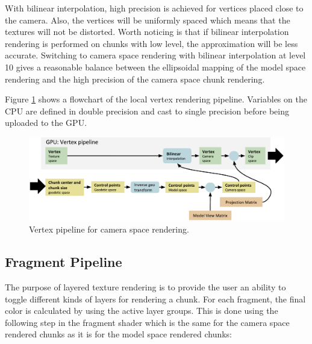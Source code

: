 With bilinear interpolation, high precision is achieved for vertices placed close to the camera. Also, the vertices will be uniformly spaced which means that the textures will not be distorted. Worth noticing is that if bilinear interpolation rendering is performed on chunks with low level, the approximation will be less accurate. Switching to camera space rendering with bilinear interpolation at level 10 gives a reasonable balance between the ellipsoidal mapping of the model space rendering and the high precision of the camera space chunk rendering.

Figure \ref{fig:pipelinelocal} shows a flowchart of the local vertex rendering pipeline. Variables on the CPU are defined in double precision and cast to single precision before being uploaded to the GPU.

\begin{figure}[htbp]
    \centering
    \includegraphics[width=\textwidth]{figures/implementation/rendering/pipeline_local.pdf}
    \caption{Vertex pipeline for camera space rendering.}
    \label{fig:pipelinelocal}
\end{figure}

\subsection{Fragment Pipeline}

The purpose of layered texture rendering is to provide the user an ability to toggle different kinds of layers for rendering a chunk. For each fragment, the final color is calculated by using the active layer groups. This is done using the following step in the fragment shader which is the same for the camera space rendered chunks as it is for the model space rendered chunks:


